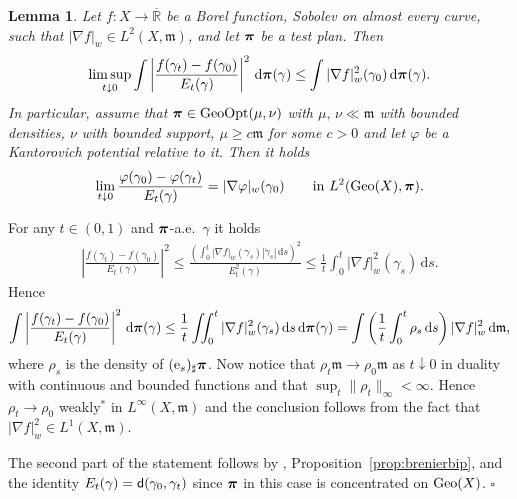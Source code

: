 \documentclass[reqno,11pt]{article}
\numberwithin{equation}{section}
\newcommand{\R}{\mathbb{R}}
\newcommand{\mm}{{\mbox{\boldmath$m$}}}
\newcommand{\ppi}{{\mbox{\boldmath$\pi$}}}
\newcommand{\sfd}{{\sf d}}
\renewcommand{\d}{{\mathrm d}}
\newenvironment{proof}{\removelastskip\par\medskip   %
\noindent{\em Proof.}
\rm}{\penalty-20\null\hfill$\square$\par\medbreak}
\newtheorem{lemma}[theorem]{Lemma}
\newcommand{\geo}{{\rm{Geo}}}                       %
\newcommand{\e}{{\rm{e}}}                           %
\newcommand{\gopt}{{\rm{GeoOpt}}}                   %
\newcommand{\weakgrad}[1]{|\nabla #1|_w}                %
\renewcommand{\mm}{\mathfrak m}
\begin{document}
\begin{lemma}\label{le:perhorver}
Let $f:X\to\overline{\R}$ be a Borel function, Sobolev on almost
every curve, such that $\weakgrad f\in L^2(X,\mm)$, and let $\ppi$
be a test plan. Then
\begin{equation}\label{eq:aprioriEt}
\limsup_{t\downarrow
0}\int\left|\frac{f(\gamma_t)-f(\gamma_0)}{E_t(\gamma)}\right|^2\,\d\ppi(\gamma)\leq
\int\weakgrad f^2(\gamma_0)\,\d\ppi(\gamma).
\end{equation}
In particular, assume that  $\ppi\in\gopt(\mu,\nu)$ with
$\mu,\,\nu\ll\mm$ with bounded densities, $\nu$ with bounded
support, $\mu\geq c\mm$ for some $c>0$ and let $\varphi$ be a
Kantorovich potential relative to it. Then it holds
\begin{equation}
\label{eq:limitepot}
\lim_{t\downarrow0}\frac{\varphi(\gamma_0)-\varphi(\gamma_t)}
{E_t(\gamma)}=\weakgrad\varphi(\gamma_0) \qquad\text{in
$L^2(\geo(X),\ppi)$.}
\end{equation}
\end{lemma}
\begin{proof}
For any $t\in(0,1)$ and $\ppi$-a.e.~$\gamma$ it holds
\begin{equation}\label{eq:BtDt1}
\begin{split}
\left|\frac{f(\gamma_{t})-f(\gamma_0)}{E_t(\gamma)}\right|^2\leq\frac{\left(\int_0^t\weakgrad
f(\gamma_s)|\dot\gamma_s|\,\d s\right)^2}{E_t^2(\gamma)}\leq \frac
1t\int_0^t \weakgrad f^2(\gamma_s)\,\d s.
\end{split}
\end{equation}
Hence
\[
\int\left|\frac{f(\gamma_{t})-f(\gamma_0)}{E_t(\gamma)}\right|^2\,\d\ppi(\gamma)\leq
\frac1t\iint_0^t\weakgrad f^2(\gamma_s)\,\d s\,\d\ppi(\gamma)=\int
\left(\frac1t\int_0^t\rho_s\,\d s\right)\weakgrad f^2\,\d\mm,
\]
where $\rho_s$ is the density of $(\e_s)_\sharp\ppi$. Now notice
that $\rho_t\mm\to\rho_0\mm$ as $t\downarrow 0$ in duality with
continuous and bounded functions and that
$\sup_t\|\rho_t\|_\infty<\infty$. Hence $\rho_t\to\rho_0$ weakly$^*$
in $L^\infty(X,\mm)$ and the conclusion follows from the fact that
$\weakgrad f^2\in L^1(X,\mm)$.

The second part of the statement follows by \cite[Theorem
10.3]{Ambrosio-Gigli-Savare11}, Proposition~\ref{prop:brenierbip},
and the identity $E_t(\gamma)=\sfd(\gamma_0,\gamma_t)$ since $\ppi$
in this case is concentrated on $\geo(X)$.
\end{proof}
\end{document}
